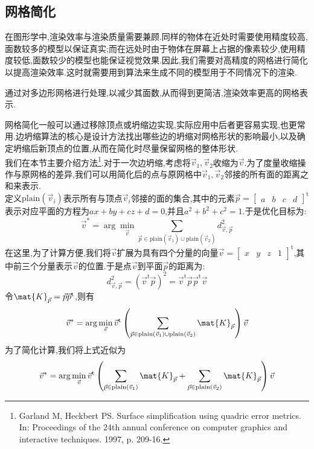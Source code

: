 \documentclass{ctexart}
\begin{document}
\subsection{网格简化}
在图形学中,渲染效率与渲染质量需要兼顾.同样的物体在近处时需要使用精度较高,面数较多的模型以保证真实;而在远处时由于物体在屏幕上占据的像素较少,使用精度较低,面数较少的模型也能保证视觉效果.因此,我们需要对高精度的网格进行简化以提高渲染效率.这时就需要用到算法来生成不同的模型用于不同情况下的渲染.
\begin{definition}
    通过对多边形网格进行处理,以减少其面数,从而得到更简洁,渲染效率更高的网格表示.
\end{definition}
网格简化一般可以通过移除顶点或坍缩边实现,实际应用中后者更容易实现,也更常用.边坍缩算法的核心是设计方法找出哪些边的坍缩对网格形状的影响最小,以及确定坍缩后新顶点的位置,从而在简化时尽量保留网格的整体形状.\\
\indent 我们在本节主要介绍方法\footnote{Garland M, Heckbert PS. Surface simplification using quadric error metrics. In: Proceedings of the 24th annual conference on computer graphics and interactive techniques. 1997, p. 209-16.}.对于一次边坍缩,考虑将$\vec{v}_1,\vec{v}_2$收缩为$\vec{v}$.为了度量收缩操作与原网格的差异,我们可以用简化后的点与原网格中$\vec{v}_1,\vec{v}_2$邻接的所有面的距离之和来表示.\\
\indent 定义$\text{plain}\left(\vec{v}_i\right)$表示所有与顶点$\vec{v}_i$邻接的面的集合,其中的元素$\vec{p}=\begin{bmatrix}
    a&b&c&d
\end{bmatrix}^{\text{t}}$表示对应平面的方程为$ax+by+cz+d=0$,并且$a^2+b^2+c^2=1$.于是优化目标为:
\[\vec{v}^\ast=\arg\min_{\vec{v}}\sum_{\vec{p}\in\text{plain}\left(\vec{v}_1\right)\cup\text{plain}\left(\vec{v}_2\right)}d_{\vec{v},\vec{p}}^2\]
在这里,为了计算方便,我们将$\vec{v}$扩展为具有四个分量的向量$\vec{v}=\begin{bmatrix}
    x&y&z&1
\end{bmatrix}^{\text{t}}$,其中前三个分量表示$\vec{v}$的位置.于是点$\vec{v}$到平面$\vec{p}$的距离为:
\[d_{\vec{v},\vec{p}}^2=\left(\vec{v}^{\text{t}}\vec{p}\right)^2=\vec{v}^{\text{t}}\vec{p}\vec{p}^{\text{t}}\vec{v}\]
令$\mat{K}_{\vec{p}}=\vec{p}\vec{p}^{\text{t}}$,则有
\[\vec{v}^\ast=\arg\min_{\vec{v}}\vec{v}^{\text{t}}\left(\sum_{\vec{p}\in\text{plain}\left(\vec{v}_1\right)\cup\text{plain}\left(\vec{v}_2\right)}\mat{K}_{\vec{p}}\right)\vec{v}\]
为了简化计算,我们将上式近似为
\[\vec{v}^\ast=\arg\min_{\vec{v}}\vec{v}^{\text{t}}\left(\sum_{\vec{p}\in\text{plain}\left(\vec{v}_1\right)}\mat{K}_{\vec{p}}+\sum_{\vec{p}\in\text{plain}\left(\vec{v}_2\right)}\mat{K}_{\vec{p}}\right)\vec{v}\]
\end{document}
